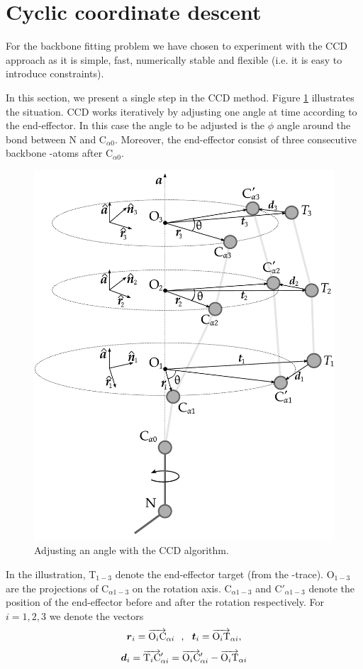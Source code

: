 \section{Cyclic coordinate descent}
For the backbone fitting problem we have chosen to experiment with the CCD approach as it is simple, fast, numerically stable and flexible (i.e. it is easy to introduce constraints).

In this section, we present a single step in the CCD method.
Figure \ref{fig:ccd} illustrates the situation.
CCD works iteratively by adjusting one angle at time according to the end-effector.
In this case the angle to be adjusted is the $\phi$ angle around the bond between N and C$_{\alpha0}$. Moreover, the end-effector consist of three consecutive backbone \Ca-atoms after C$_{\alpha0}$.

\begin{figure}
  \centering
	\includegraphics[width=0.98\columnwidth]{figures/ccd}
  \caption{Adjusting an angle with the CCD algorithm.}
  \label{fig:ccd}
\end{figure}


In the illustration, T$_{1-3}$ denote the end-effector target (from the \Ca-trace). O$_{1-3}$ are the projections of C$_{\alpha1-3}$ on the rotation axis. C$_{\alpha1-3}$ and C$'_{\alpha1-3}$ denote the position of the end-effector before and after the rotation respectively.
For $i=1,2,3$ we denote the vectors
 $$\boldsymbol{r}_i = \overrightarrow{\text{O}_i\text{C}}_{\alpha i}~~,~~ \boldsymbol{t}_i = \overrightarrow{\text{O}_i\text{T}}_{\alpha i} , $$
$$\boldsymbol{d}_i = \overrightarrow{\text{T}_i\text{C}}'_{\alpha i} = \overrightarrow{\text{O}_i\text{C}}'_{\alpha i}-\overrightarrow{\text{O}_i\text{T}}_{\alpha i}$$

